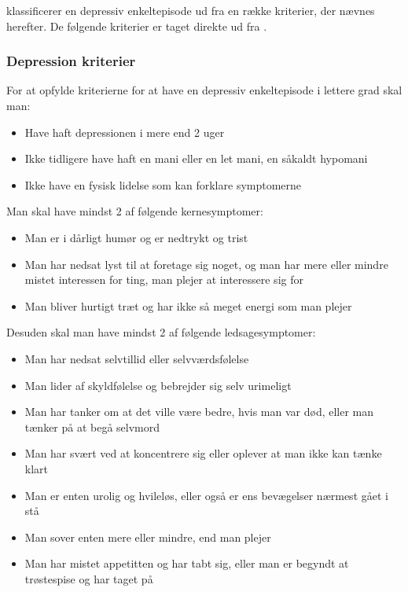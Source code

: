 \citet{misc:netpsykdepression} klassificerer en depressiv enkeltepisode ud fra en række kriterier, der nævnes herefter.
De følgende kriterier er taget direkte ud fra \citet{misc:netpsykdepression}.

\begin{mdframed}
\subsubsection{Depression kriterier}
For at opfylde kriterierne for at have en depressiv enkeltepisode i lettere grad skal man:
\begin{itemize}
	\item Have haft depressionen i mere end 2 uger
	\item Ikke tidligere have haft en mani eller en let mani, en såkaldt hypomani
	\item Ikke have en fysisk lidelse som kan forklare symptomerne
\end{itemize}
Man skal have mindst 2 af følgende kernesymptomer:
\begin{itemize}
	\item Man er i dårligt humør og er nedtrykt og trist
	\item Man har nedsat lyst til at foretage sig noget, og man har mere eller mindre mistet interessen for ting, man plejer at interessere sig for
	\item Man bliver hurtigt træt og har ikke så meget energi som man plejer
\end{itemize}
Desuden skal man have mindst 2 af følgende ledsagesymptomer:
\begin{itemize}
	\item Man har nedsat selvtillid eller selvværdsfølelse
	\item Man lider af skyldfølelse og bebrejder sig selv urimeligt
	\item Man har tanker om at det ville være bedre, hvis man var død, eller man tænker på at begå selvmord
	\item Man har svært ved at koncentrere sig eller oplever at man ikke kan tænke klart
	\item Man er enten urolig og hvileløs, eller også er ens bevægelser nærmest gået i stå
	\item Man sover enten mere eller mindre, end man plejer
	\item Man har mistet appetitten og har tabt sig, eller man er begyndt at trøstespise og har taget på
\end{itemize}
\end{mdframed}

